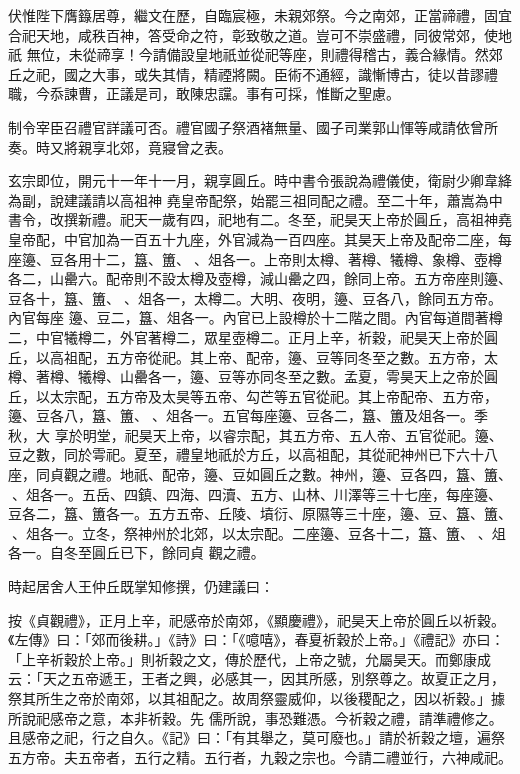 \begin{pinyinscope}
 伏惟陛下膺籙居尊，繼文在歷，自臨宸極，未親郊祭。今之南郊，正當禘禮，固宜合祀天地，咸秩百神，答受命之符，彰致敬之道。豈可不崇盛禮，同彼常郊，使地祇
 無位，未從禘享！今請備設皇地祇並從祀等座，則禮得稽古，義合緣情。然郊丘之祀，國之大事，或失其情，精禋將闕。臣術不通經，識慚博古，徒以昔謬禮職，今忝諫曹，正議是司，敢陳忠讜。事有可採，惟斷之聖慮。



 制令宰臣召禮官詳議可否。禮官國子祭酒褚無量、國子司業郭山惲等咸請依曾所奏。時又將親享北郊，竟寢曾之表。



 玄宗即位，開元十一年十一月，親享圓丘。時中書令張說為禮儀使，衛尉少卿韋絳為副，說建議請以高祖神
 堯皇帝配祭，始罷三祖同配之禮。至二十年，蕭嵩為中書令，改撰新禮。祀天一歲有四，祀地有二。冬至，祀昊天上帝於圓丘，高祖神堯皇帝配，中官加為一百五十九座，外官減為一百四座。其昊天上帝及配帝二座，每座籩、豆各用十二，簋、簠、、俎各一。上帝則太樽、著樽、犧樽、象樽、壺樽各二，山罍六。配帝則不設太樽及壺樽，減山罍之四，餘同上帝。五方帝座則籩、豆各十，簋、簠、、俎各一，太樽二。大明、夜明，籩、豆各八，餘同五方帝。內官每座
 籩、豆二，簋、俎各一。內官已上設樽於十二階之間。內官每道間著樽二，中官犧樽二，外官著樽二，眾星壺樽二。正月上辛，祈穀，祀昊天上帝於圓丘，以高祖配，五方帝從祀。其上帝、配帝，籩、豆等同冬至之數。五方帝，太樽、著樽、犧樽、山罍各一，籩、豆等亦同冬至之數。孟夏，雩昊天上之帝於圓丘，以太宗配，五方帝及太昊等五帝、勾芒等五官從祀。其上帝配帝、五方帝，籩、豆各八，簋、簠、、俎各一。五官每座籩、豆各二，簋、簠及俎各一。季秋，大
 享於明堂，祀昊天上帝，以睿宗配，其五方帝、五人帝、五官從祀。籩、豆之數，同於雩祀。夏至，禮皇地祇於方丘，以高祖配，其從祀神州已下六十八座，同貞觀之禮。地祇、配帝，籩、豆如圓丘之數。神州，籩、豆各四，簋、簠、、俎各一。五岳、四鎮、四海、四瀆、五方、山林、川澤等三十七座，每座籩、豆各二，簋、簠各一。五方五帝、丘陵、墳衍、原隰等三十座，籩、豆、簋、簠、、俎各一。立冬，祭神州於北郊，以太宗配。二座籩、豆各十二，簋、簠、、俎各一。自冬至圓丘已下，餘同貞
 觀之禮。



 時起居舍人王仲丘既掌知修撰，仍建議曰：



 按《貞觀禮》，正月上辛，祀感帝於南郊，《顯慶禮》，祀昊天上帝於圓丘以祈穀。《左傳》曰：「郊而後耕。」《詩》曰：「《噫嘻》，春夏祈穀於上帝。」《禮記》亦曰：「上辛祈穀於上帝。」則祈穀之文，傳於歷代，上帝之號，允屬昊天。而鄭康成云：「天之五帝遞王，王者之興，必感其一，因其所感，別祭尊之。故夏正之月，祭其所生之帝於南郊，以其祖配之。故周祭靈威仰，以後稷配之，因以祈穀。」據所說祀感帝之意，本非祈穀。先
 儒所說，事恐難憑。今祈穀之禮，請準禮修之。且感帝之祀，行之自久。《記》曰：「有其舉之，莫可廢也。」請於祈穀之壇，遍祭五方帝。夫五帝者，五行之精。五行者，九穀之宗也。今請二禮並行，六神咸祀。




\end{pinyinscope}
